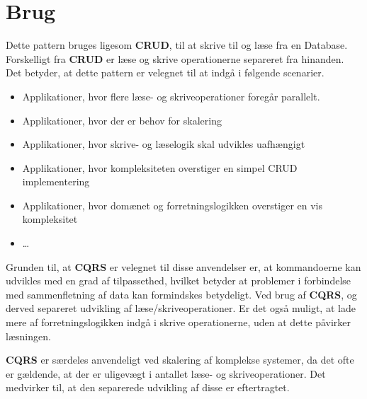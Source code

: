 \section{Brug}
Dette pattern bruges ligesom \textbf{CRUD}, til at skrive til og læse fra en Database. Forskelligt fra \textbf{CRUD} er læse og skrive operationerne separeret fra hinanden. Det betyder, at dette pattern er velegnet til at indgå i følgende scenarier.

\begin{itemize}  
	\item Applikationer, hvor flere læse- og skriveoperationer foregår parallelt.
	\item Applikationer, hvor der er behov for skalering
	\item Applikationer, hvor skrive- og læselogik skal udvikles uafhængigt
	\item Applikationer, hvor kompleksiteten overstiger en simpel CRUD implementering
	\item Applikationer, hvor domænet og forretningslogikken overstiger en vis kompleksitet
	\item \ldots
	
\end{itemize}

Grunden til, at \textbf{CQRS} er velegnet til disse anvendelser er, at kommandoerne kan udvikles med en grad af tilpassethed, hvilket betyder at problemer i forbindelse med sammenfletning af data kan formindskes betydeligt.
Ved brug af \textbf{CQRS}, og derved separeret udvikling af læse/skriveoperationer. Er det også muligt, at lade mere af forretningslogikken indgå i skrive operationerne, uden at dette påvirker læsningen.

\textbf{CQRS} er særdeles anvendeligt ved skalering af komplekse systemer, da det ofte er gældende, at der er uligevægt i antallet læse- og skriveoperationer. Det medvirker til, at den separerede udvikling af disse er eftertragtet.
 


